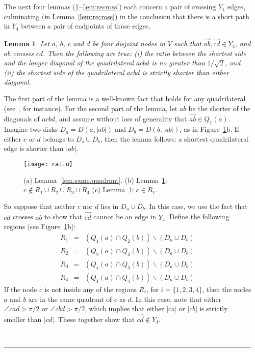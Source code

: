 \pdfoutput=1  \documentclass[11pt]{article}
\newtheorem{lemma}{Lemma}
\newcommand{\qed}{\rule{0.5em}{1.5ex}}
\newcommand{\fqed}{{\hfill~\qed}}
\newenvironment{proof}{{\noindent \bf Proof.}}
                      {{\hfill \fqed} \vspace{1em}}
\begin{document}
The next four lemmas (\ref{lem:quad}--\ref{lem:recross})
each concern a pair of crossing $Y_4$ edges,
culminating (in Lemma~\ref{lem:recross}) in the conclusion
that there is a short path in $Y_4$ between a pair of endpoints
of those edges.

\begin{lemma}
Let $a$, $b$, $c$ and $d$ be four disjoint nodes in $V$ such that
$\overrightarrow{ab}, \overrightarrow{cd} \in Y_4$, and
$ab$ crosses $cd$. Then the following are true: (i) the ratio between the
shortest side and the longer diagonal of the quadrilateral $acbd$ is
no greater than $1/\sqrt{2}$, and (ii) the
shortest side of the quadrilateral $acbd$ is strictly shorter
than either diagonal.
\label{lem:quad}
\end{lemma}
\begin{proof}
The first part of the lemma is a well-known fact that holds for
any quadrilateral (see~\cite{Quad51}, for instance).
For the second part of the lemma, let $ab$ be the shorter of the
diagonals of $acbd$, and assume without loss of generality
that $\overrightarrow{ab} \in Q_1(a)$.
Imagine two disks $D_a = D(a, |ab|)$ and $D_{b} = D(b,  |ab|)$,
as in Figure~\ref{fig:ratio}b. If either $c$ or $d$ belongs to
$D_a \cup D_{b}$,
then the lemma follows: a shortest quadrilateral edge is shorter
than $|ab|$.

\begin{figure}[htbp]
\centering
\texttt{[image: ratio]}
\caption{(a) Lemma~\ref{lem:same.quadrant}. (b) Lemma~\ref{lem:quad}: $c \notin R_1\cup R_2\cup R_3 \cup R_4$ (c) Lemma~\ref{lem:quad}: $c \in R_1$.}
\label{fig:ratio}
\end{figure}


So suppose that neither $c$ nor $d$ lies in $D_a \cup D_{b}$. In
this case, we use the fact that $cd$ crosses $ab$ to show that
$\overrightarrow{cd}$ cannot be an edge in $Y_4$.
Define the following regions (see Figure~\ref{fig:ratio}b):
\begin{eqnarray*}
R_1&=& (Q_1(a) \cap Q_2(b)) \backslash( D_a \cup D_{b})\\
R_2&=& (Q_2(a) \cap Q_3(b)) \backslash( D_a \cup D_{b})\\
R_3&=& (Q_4(a) \cap Q_3(b)) \backslash( D_a \cup D_{b})\\
R_4&=& (Q_1(a) \cap Q_4(b)) \backslash( D_a \cup D_{b})
\end{eqnarray*}
If the node $c$ is not inside any of the regions $R_i$, for $i = \{1,2,3,4\}$, then
the nodes $a$ and $b$ are in the same quadrant of $c$ as $d$. In this case, note that
either $\angle cad > \pi/2$ or $\angle cbd > \pi/2$, which implies that either
$|ca|$ or $|cb|$ is strictly smaller than $|cd|$. These together show that
$\overrightarrow{cd} \notin Y_4$.


\end{proof}
\end{document}
